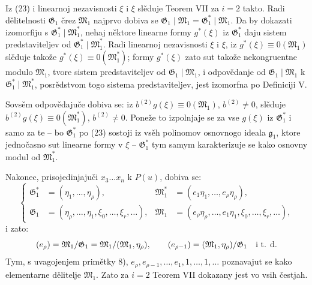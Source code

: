 \documentclass[11pt]{article}
\providecommand{\Gmod}{\mathfrak G}
\providecommand{\Mmod}{\mathfrak M}
\providecommand{\gideal}{\mathfrak g}
\begin{document}
Iz (23) i linearnoj nezavisnosti $\xi$ i $\xi$ slěduje Teorem VII za $i=2$ takto. Radi dělitelnosti $\Gmod_1$ črez $\Mmod_1$ najprvo dobiva se $\Gmod_1\mid\Mmod_1=\Gmod^*_1\mid\Mmod_1$. Da by dokazati izomorfiju s $\Gmod^*_1\mid\Mmod^*_1$, nehaj něktore linearne formy $g^*(\xi)$ iz $\Gmod^*_1$ daju sistem predstaviteljev od $\Gmod^*_1\mid\Mmod^*_1$. Radi linearnoj nezavisnosti $\xi$ i $\xi$, iz $g^*(\xi)\equiv 0(\Mmod_1)$ slěduje takože $g^*(\xi)\equiv 0(\Mmod^*_1)$; formy $g^*(\xi)$ zato sut takože nekongruentne modulo $\Mmod_1$, tvore sistem predstaviteljev od $\Gmod_1\mid\Mmod_1$, i odpovědanje od $\Gmod_1\mid\Mmod_1$ k $\Gmod^*_1\mid\Mmod^*_1$, posrědstvom togo sistema predstaviteljev, jest izomorfna po Definiciji V.

Sovsěm odpovědajuče dobiva se: iz $b^{(2)}g(\xi)\equiv0(\Mmod_1)$, $b^{(2)}\ne0$, slěduje $b^{(2)}g(\xi)\equiv0(\Mmod^*_1)$, $b^{(2)}\ne0$. Poneže to izpolnjaje se za vse $g(\xi)$ iz $\Gmod^*_1$ i samo za te -- bo $\Gmod^*_1$ po (23) sostoji iz vsěh polinomov osnovnogo ideala $\gideal_1$, ktore jednočasno sut linearne formy v $\xi$ -- $\Gmod^*_1$ tym samym karakterizuje se kako osnovny modul od $\Mmod^*_1$.

Nakonec, prisojedinjajuči $x_3\ldots x_n$ k $P(u)$, dobiva se:
\begin{equation}
\left\{\begin{aligned}
 \Gmod^*_1&=(\eta_1,\ldots,\eta_\rho),&
 \Mmod^*_1&=(e_1\eta_1,\ldots,e_\rho\eta_\rho),\\
 \Gmod_1&=(\eta_\rho,\ldots,\eta_1,\xi_0,\ldots,\xi_r,\ldots),&
 \Mmod_1&=(e_\rho\eta_\rho,\ldots,e_1\eta_1,\xi_0,\ldots,\xi_r,\ldots),
\end{aligned}\right.
\tag{24}
\end{equation}
i zato:
\[
 (e_\rho)=\Mmod_1/\Gmod_1=\Mmod_1/(\Mmod_1,\eta_\rho),\qquad
 (e_{\rho-1})=(\Mmod_1,\eta_\rho)/\Gmod_1\quad\hbox{i t. d.}
\]
Tym, s uvagojenjem primětky 8), $e_\rho,e_{\rho-1},\ldots,e_1,1,\ldots,1,\ldots$ poznavajut se kako elementarne dělitelje $\Mmod_1$. Zato za $i=2$ Teorem VII dokazany jest vo vsih čestjah.
\end{document}
